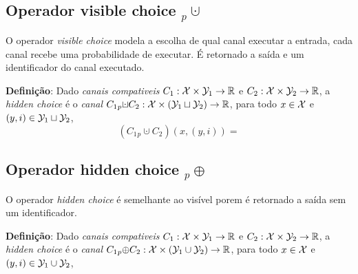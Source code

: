 \subsection*{Operador visible choice ${}_p{\cupdot}$}  
O operador \emph{visible choice} modela a escolha de qual canal executar a entrada, cada canal recebe uma probabilidade de executar. É retornado a saída e um identificador do canal executado.

\textbf{Definição}: Dado \emph{canais compativeis} $C_1:\mathcal{X}\times\mathcal{Y}_1 \rightarrow \mathbb{R}$ e $C_2:\mathcal{X}\times\mathcal{Y}_2 \rightarrow \mathbb{R}$, a \emph{hidden choice} é o \emph{canal} $C_1 {}_p{\cupdot} C_2: \calx\times (\caly_1 \sqcup \caly_2)\rightarrow\reals$, para todo $x\in\mathcal{X}$ e $(y,i)\in\mathcal{Y}_1\sqcup\mathcal{Y}_2$,
$$ (C_1 {}_p{\cupdot} C_2)(x,(y,i)) =  $$ 

\subsection*{Operador hidden choice ${}_p{\oplus}$}  
O operador \emph{hidden choice} é semelhante ao visível porem é retornado a saída sem um identificador.

\textbf{Definição}: Dado \emph{canais compativeis} $C_1:\mathcal{X}\times\mathcal{Y}_1 \rightarrow \mathbb{R}$ e $C_2:\mathcal{X}\times\mathcal{Y}_2 \rightarrow \mathbb{R}$, a \emph{hidden choice} é o \emph{canal} $C_1 {}_p{\oplus} C_2: \mathcal{X}\times (\mathcal{Y}_1 \cup \mathcal{Y}_2)\rightarrow\mathbb{R}$, para todo $x\in\mathcal{X}$ e $(y,i)\in\mathcal{Y}_1\cup\mathcal{Y}_2$,
